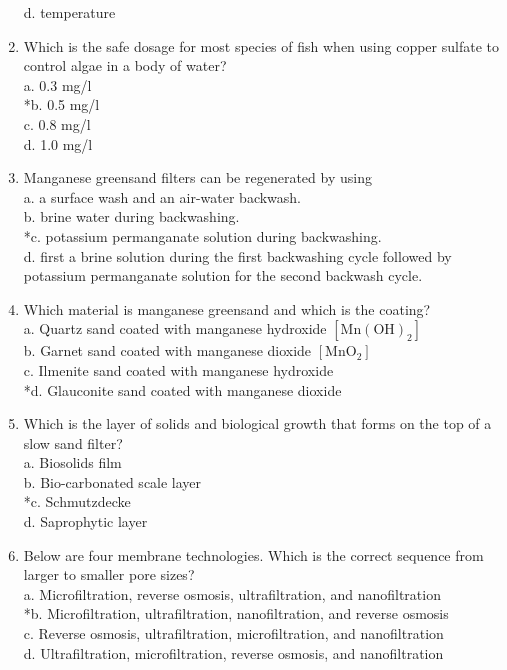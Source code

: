 \begin{enumerate}
d. temperature\\
\item Which is the safe dosage for most species of fish when using copper sulfate to control algae in a body of water?\\
a.  0.3 mg/l\\
*b. 0.5 mg/l\\
c.  0.8 mg/l\\
d. 1.0 mg/l\\
\item Manganese greensand filters can be regenerated by using\\
a. a surface wash and an air-water backwash.\\
b. brine water during backwashing.\\
*c. potassium permanganate solution during backwashing.\\
d. first a brine solution during the first backwashing cycle followed by potassium permanganate solution for the second backwash cycle.\\
\item Which material is manganese greensand and which is the coating?\\
a. Quartz sand coated with manganese hydroxide $\left[\mathrm{Mn}(\mathrm{OH})_{2}\right]$\\
b. Garnet sand coated with manganese dioxide $\left[\mathrm{MnO}_{2}\right]$\\
c. Ilmenite sand coated with manganese hydroxide\\
*d. Glauconite sand coated with manganese dioxide\\
\item Which is the layer of solids and biological growth that forms on the top of a slow sand filter?\\
a. Biosolids film\\
b. Bio-carbonated scale layer\\
*c. Schmutzdecke\\
d. Saprophytic layer
\item Below are four membrane technologies. Which is the correct sequence from larger to smaller pore sizes?\\
a. Microfiltration, reverse osmosis, ultrafiltration, and nanofiltration\\
*b. Microfiltration, ultrafiltration, nanofiltration, and reverse osmosis\\
c. Reverse osmosis, ultrafiltration, microfiltration, and nanofiltration\\
d. Ultrafiltration, microfiltration, reverse osmosis, and nanofiltration\\

\end{enumerate}
